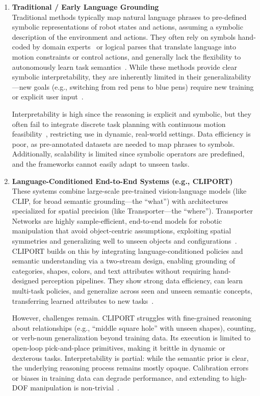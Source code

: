 \documentclass[12pt]{extarticle}
\begin{document}
\begin{enumerate}[label=\Roman*.]
    \item \textbf{Traditional / Early Language Grounding} \\
Traditional methods typically map natural language phrases to pre-defined symbolic representations of robot states and actions, assuming a symbolic description of the environment and actions. They often rely on symbols hand-coded by domain experts~\cite{optimizatoin-and-motion-planning} or logical parses that translate language into motion constraints or control actions, and generally lack the flexibility to autonomously learn task semantics~\cite{learning-neuro-symbolic}. While these methods provide clear symbolic interpretability, they are inherently limited in their generalizability—new goals (e.g., switching from red pens to blue pens) require new training or explicit user input~\cite{ns-vqa}.

Interpretability is high since the reasoning is explicit and symbolic, but they often fail to integrate discrete task planning with continuous motion feasibility~\cite{tamp}, restricting use in dynamic, real-world settings. Data efficiency is poor, as pre-annotated datasets are needed to map phrases to symbols. Additionally, scalability is limited since symbolic operators are predefined, and the frameworks cannot easily adapt to unseen tasks.

    \item \textbf{Language-Conditioned End-to-End Systems (e.g., CLIPORT)} \\
These systems combine large-scale pre-trained vision-language models (like CLIP, for broad semantic grounding—the “what”) with architectures specialized for spatial precision (like Transporter—the “where”). Transporter Networks are highly sample-efficient, end-to-end models for robotic manipulation that avoid object-centric assumptions, exploiting spatial symmetries and generalizing well to unseen objects and configurations~\cite{transporter}. CLIPORT builds on this by integrating language-conditioned policies and semantic understanding via a two-stream design, enabling grounding of categories, shapes, colors, and text attributes without requiring hand-designed perception pipelines. They show strong data efficiency, can learn multi-task policies, and generalize across seen and unseen semantic concepts, transferring learned attributes to new tasks~\cite{cliport}.

However, challenges remain. CLIPORT struggles with fine-grained reasoning about relationships (e.g., “middle square hole” with unseen shapes), counting, or verb-noun generalization beyond training data. Its execution is limited to open-loop pick-and-place primitives, making it brittle in dynamic or dexterous tasks. Interpretability is partial: while the semantic prior is clear, the underlying reasoning process remains mostly opaque. Calibration errors or biases in training data can degrade performance, and extending to high-DOF manipulation is non-trivial~\cite{cliport}.


\end{enumerate}
\end{document}
